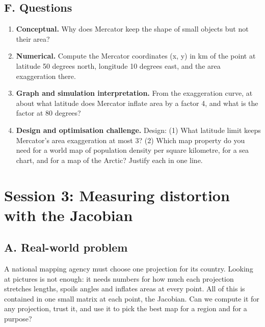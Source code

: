 \documentclass[11pt,a4paper]{article}
\begin{document}
\subsection*{F. Questions}
\begin{enumerate}[nosep]
\item \textbf{Conceptual.} Why does Mercator keep the shape of small objects but not their area?
\item \textbf{Numerical.} Compute the Mercator coordinates (x, y) in km of the point at latitude 50 degrees north, longitude 10 degrees east, and the area exaggeration there.
\item \textbf{Graph and simulation interpretation.} From the exaggeration curve, at about what latitude does Mercator inflate area by a factor 4, and what is the factor at 80 degrees?
\item \textbf{Design and optimisation challenge.} Design: (1) What latitude limit keeps Mercator's area exaggeration at most 3? (2) Which map property do you need for a world map of population density per square kilometre, for a sea chart, and for a map of the Arctic? Justify each in one line.
\end{enumerate}

\section{Session 3: Measuring distortion with the Jacobian}

\subsection*{A. Real-world problem}
A national mapping agency must choose one projection for its country. Looking at pictures is not enough: it needs numbers for how much each projection stretches lengths, spoils angles and inflates areas at every point. All of this is contained in one small matrix at each point, the Jacobian. Can we compute it for any projection, trust it, and use it to pick the best map for a region and for a purpose?
\end{document}
